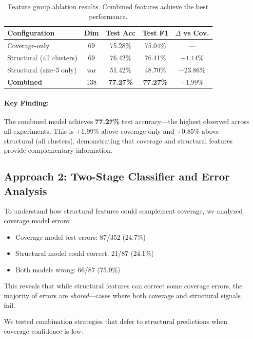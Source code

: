 \documentclass[12pt,a4paper]{article}
\begin{document}
\begin{table}[h]
\centering
\begin{tabular}{lcccc}
\hline
\textbf{Configuration} & \textbf{Dim} & \textbf{Test Acc} & \textbf{Test F1} & \textbf{$\Delta$ vs Cov.} \\
\hline
Coverage-only & 69 & 75.28\% & 75.04\% & --- \\
Structural (all clusters) & 69 & 76.42\% & 76.41\% & $+1.14\%$ \\
Structural (size-3 only) & var & 51.42\% & 48.70\% & $-23.86\%$ \\
\textbf{Combined} & 138 & \textbf{77.27\%} & \textbf{77.27\%} & $+1.99\%$ \\
\hline
\end{tabular}
\caption{Feature group ablation results. Combined features achieve the best performance.}
\label{tab:hybrid_ablation}
\end{table}

\paragraph{Key Finding:} The combined model achieves \textbf{77.27\%} test accuracy---the highest
observed across all experiments. This is $+1.99\%$ above coverage-only and $+0.85\%$ above
structural (all clusters), demonstrating that coverage and structural features provide
complementary information.

\subsection{Approach 2: Two-Stage Classifier and Error Analysis}

To understand how structural features could complement coverage, we analyzed coverage model errors:

\begin{itemize}
\item Coverage model test errors: 87/352 (24.7\%)
\item Structural model could correct: 21/87 (24.1\%)
\item Both models wrong: 66/87 (75.9\%)
\end{itemize}

This reveals that while structural features can correct some coverage errors, the majority
of errors are \textit{shared}---cases where both coverage and structural signals fail.

We tested combination strategies that defer to structural predictions when coverage confidence is low:
\end{document}
